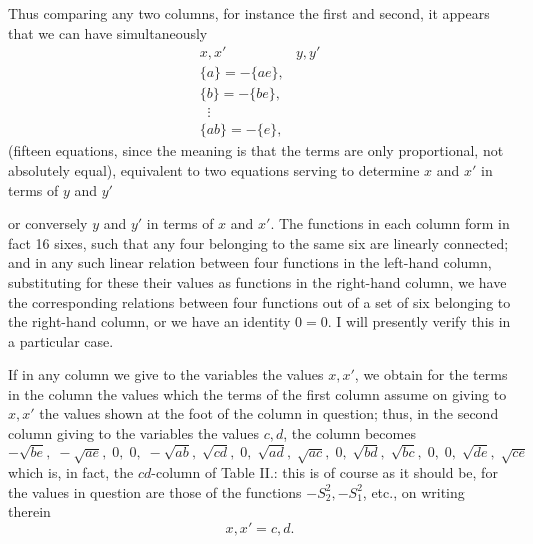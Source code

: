 \documentclass[11pt,a4paper]{article}
\begin{document}
\medskip

Thus comparing any two columns, for instance the first and second, it appears that we can have simultaneously
\[
\begin{array}{ll}
x, x' & y, y'\\
\{a\} = -\{ae\},\\
\{b\} = -\{be\},\\
\;\;\vdots\\
\{ab\} = -\{e\},
\end{array}
\]
(fifteen equations, since the meaning is that the terms are only proportional, not absolutely equal), equivalent to two equations serving to determine $x$ and $x'$ in terms of $y$ and $y'$

\newpage


\noindent or conversely $y$ and $y'$ in terms of $x$ and $x'$. The functions in each column form in fact 16 sixes, such that any four belonging to the same six are linearly connected; and in any such linear relation between four functions in the left-hand column, substituting for these their values as functions in the right-hand column, we have the corresponding relations between four functions out of a set of six belonging to the right-hand column, or we have an identity $0 = 0$. I will presently verify this in a particular case.

\medskip

If in any column we give to the variables the values $x, x'$, we obtain for the terms in the column the values which the terms of the first column assume on giving to $x, x'$ the values shown at the foot of the column in question; thus, in the second column giving to the variables the values $c, d$, the column becomes
\[
-\sqrt{be},\;-\sqrt{ae},\;0,\;0,\;-\sqrt{ab},\;\sqrt{cd},\;0,\;\sqrt{ad},\;\sqrt{ac},\;0,\;\sqrt{bd},\;\sqrt{bc},\;0,\;0,\;\sqrt{de},\;\sqrt{ce}
\]
which is, in fact, the $cd$-column of Table II.: this is of course as it should be, for the values in question are those of the functions $-S_{2}^{2}, -S_{1}^{2}$, etc., on writing therein
\[
x, x' = c, d.
\]

\medskip
\end{document}
